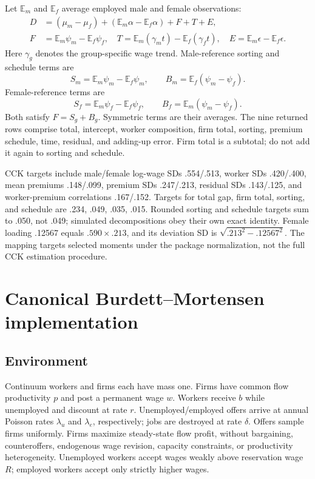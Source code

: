 \documentclass[11pt,letterpaper]{article}
\newcommand{\E}{\mathbb{E}}
\begin{document}
Let $\E_m$ and $\E_f$ average employed male and female observations:
\begin{align}
D&=(\mu_m-\mu_f)+(\E_m\alpha-\E_f\alpha)+F+T+E,\\
F&=\E_m\psi_m-\E_f\psi_f,\quad
T=\E_m(\gamma_m t)-\E_f(\gamma_f t),\quad
E=\E_m\epsilon-\E_f\epsilon.
\end{align}
Here $\gamma_g$ denotes the group-specific wage trend.
Male-reference sorting and schedule terms are
\[
S_m=\E_m\psi_m-\E_f\psi_m,\qquad B_m=\E_f(\psi_m-\psi_f).
\]
Female-reference terms are
\[
S_f=\E_m\psi_f-\E_f\psi_f,\qquad B_f=\E_m(\psi_m-\psi_f).
\]
Both satisfy $F=S_g+B_g$. Symmetric terms are their averages.
The nine returned rows comprise total, intercept, worker composition,
firm total, sorting, premium schedule, time, residual, and adding-up error.
Firm total is a subtotal; do not add it again to sorting and schedule.

CCK targets include male/female log-wage SDs .554/.513, worker SDs
.420/.400, mean premiums .148/.099, premium SDs .247/.213, residual
SDs .143/.125, and worker-premium correlations .167/.152. Targets for
total gap, firm total, sorting, and schedule are .234, .049, .035, .015.
Rounded sorting and schedule targets sum to .050, not .049;
simulated decompositions obey their own exact identity.
Female loading .12567 equals $.590\times.213$, and its deviation SD is
$\sqrt{.213^2-.12567^2}$. The mapping targets selected moments under the
package normalization, not the full CCK estimation procedure.

\section{Canonical Burdett--Mortensen implementation}\label{app:bm}
\subsection{Environment}
Continuum workers and firms each have mass one. Firms have common flow
productivity $p$ and post a permanent wage $w$. Workers receive $b$ while
unemployed and discount at rate $r$. Unemployed/employed offers arrive
at annual Poisson rates $\lambda_u$ and $\lambda_e$, respectively;
jobs are destroyed at rate
$\delta$. Offers sample firms uniformly. Firms maximize steady-state
flow profit, without bargaining, counteroffers, endogenous wage revision,
capacity constraints, or productivity heterogeneity. Unemployed workers
accept wages weakly above reservation wage $R$; employed workers accept
only strictly higher wages.
\end{document}

